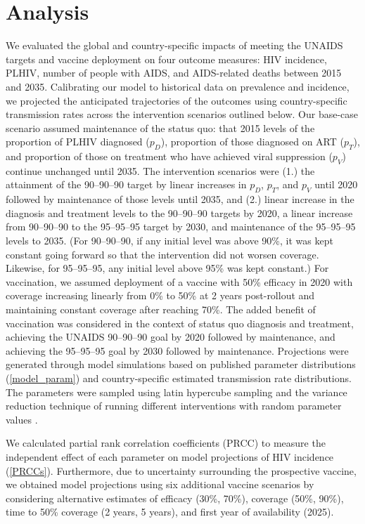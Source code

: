 \documentclass[11pt]{article}
\begin{document}
\section{Analysis}

We evaluated the global and country-specific impacts of meeting the
UNAIDS targets and vaccine deployment on four outcome measures: HIV
incidence, PLHIV, number of people with AIDS, and AIDS-related deaths
between 2015 and 2035. Calibrating our model to historical data on
prevalence and incidence, we projected the anticipated trajectories of
the outcomes using country-specific transmission rates across the
intervention scenarios outlined below.  Our base-case scenario assumed
maintenance of the status quo: that 2015 levels of the proportion of
PLHIV diagnosed ($p_{D}$), proportion of those diagnosed on ART
($p_{T}$), and proportion of those on treatment who have achieved
viral suppression ($p_{V}$) continue unchanged until 2035.  The
intervention scenarios were (1.) the attainment of the 90--90--90
target by linear increases in $p_{D}$, $p_{T}$, and $p_{V}$ until 2020
followed by maintenance of those levels until 2035, and (2.) linear
increase in the diagnosis and treatment levels to the 90--90--90
targets by 2020, a linear increase from 90--90--90 to the 95--95--95
target by 2030, and maintenance of the 95--95--95 levels to 2035. (For
90--90--90, if any initial level was above 90\%, it was kept constant
going forward so that the intervention did not worsen coverage.
Likewise, for 95--95--95, any initial level above 95\% was kept
constant.)  For vaccination, we assumed deployment of a vaccine with
50\% efficacy in 2020 with coverage increasing linearly from 0\% to
50\% at 2 years post-rollout and maintaining constant coverage after
reaching 70\%. The added benefit of vaccination was considered in the
context of status quo diagnosis and treatment, achieving the UNAIDS
90–90–90 goal by 2020 followed by maintenance, and achieving the
95–95–95 goal by 2030 followed by maintenance.  Projections were
generated through model simulations based on published parameter
distributions (\autoref{model_param}) and country-specific estimated
transmission rate distributions. The parameters were sampled using
latin hypercube sampling \cite{}
and the variance reduction technique of running different
interventions with random parameter values \cite{}.

We calculated partial rank correlation coefficients (PRCC) to measure
the independent effect of each parameter on model projections of HIV
incidence (\autoref{PRCCs}). Furthermore, due to uncertainty
surrounding the prospective vaccine, we obtained model projections
using six additional vaccine scenarios by considering alternative
estimates of efficacy (30\%, 70\%), coverage (50\%, 90\%), time to
50\% coverage (2 years, 5 years), and first year of availability
(2025).
\end{document}
